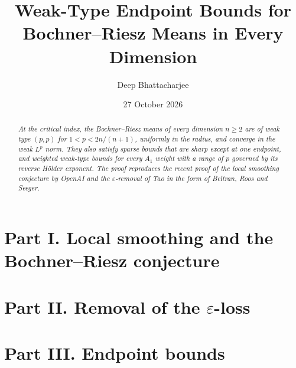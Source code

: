 \documentclass[11pt,reqno]{amsart}
\title[Endpoint Bochner--Riesz bounds]{Weak-Type Endpoint Bounds for Bochner--Riesz Means in Every Dimension}
\author{Deep Bhattacharjee}
\date{27 October 2026}
\numberwithin{equation}{section}
\theoremstyle{plain}
\theoremstyle{definition}
\theoremstyle{remark}
\begin{document}
\begin{abstract}
\emph{At the critical index, the Bochner--Riesz means of every dimension $n\ge 2$ are of
weak type $(p,p)$ for $1<p<2n/(n+1)$, uniformly in the radius, and converge in the weak
$L^p$ norm. They also satisfy sparse bounds that are sharp except at one endpoint, and
weighted weak-type bounds for every $A_1$ weight with a range of $p$ governed by its
reverse H\"older exponent. The proof reproduces the recent proof of the local smoothing
conjecture by OpenAI and the $\varepsilon$-removal of Tao in the form of Beltran, Roos and
Seeger.}
\end{abstract}

\maketitle


\part*{Part I. Local smoothing and the Bochner--Riesz conjecture}






\part*{Part II. Removal of the $\varepsilon$-loss}

\part*{Part III. Endpoint bounds}



\appendix



\end{document}

